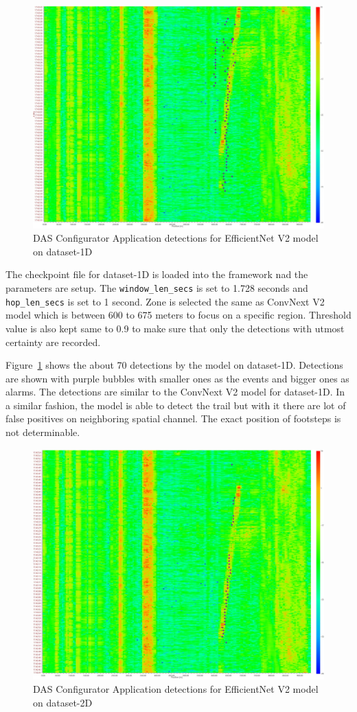 \begin{figure}[h]
  \centering
  \includegraphics[width=0.9\linewidth]{Bilder/jpg/eff_1d_eval.jpg}
  \caption{DAS Configurator Application detections for EfficientNet V2 model on dataset-1D}
  \label{eff_1d_eval}
\end{figure}

The checkpoint file for dataset-1D is loaded into the framework nad the parameters are setup. The \texttt{window\_len\_secs} is set to 1.728 seconds and \texttt{hop\_len\_secs} is set to 1 second. Zone is selected the same as ConvNext V2 model which is between 600 to 675 meters to focus on a specific region. Threshold value is also kept same to 0.9 to make sure that only the detections with utmost certainty are recorded. 

Figure~\ref{eff_1d_eval} shows the about 70 detections by the model on dataset-1D. Detections are shown with purple bubbles with smaller ones as the events and bigger ones as alarms. The detections are similar to the ConvNext V2 model for dataset-1D. In a similar fashion, the model is able to detect the trail but with it there are lot of false positives on neighboring spatial channel. The exact position of footsteps is not determinable.  

\begin{figure}[h]
  \centering
  \includegraphics[width=0.9\linewidth]{Bilder/jpg/eff_2d_eval.jpg}
  \caption{DAS Configurator Application detections for EfficientNet V2 model on dataset-2D}
  \label{eff_2d_eval}
\end{figure}

